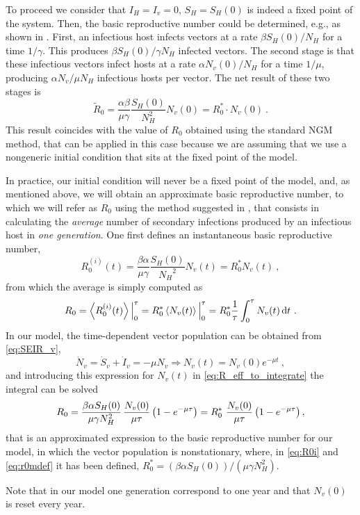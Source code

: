 To proceed we consider that $I_H=I_v=0$, $S_H=S_H(0)$ is indeed a fixed
point of the system. Then, the basic reproductive number could be determined,
e.g., as shown in \cite{Brauer2016}. First, an infectious host infects vectors
at a rate $\beta S_H(0)/N_H$ for a time $1/\gamma$. This produces $\beta
    S_H(0)/\gamma N_H$ infected vectors. The second stage is that these
infectious
vectors infect hosts at a rate $\alpha N_v(0)/N_H$ for a time $1/\mu$,
producing $\alpha N_v/\mu N_H$ infectious hosts per vector. The net result of
these two stages is
\begin{equation}
    \tilde{R}_0=\frac{\alpha\beta}{\mu\gamma}
    \frac{S_H(0)}{N_H^2}N_v(0)=R_0^*
    \cdot
    N_v(0)\ .
    \label{eq:R0tilde}
\end{equation}
This result coincides with the value of $R_0$ obtained using the standard
NGM method, that can be applied in this case because we are assuming that we
use a nongeneric initial condition that sits at the fixed point of the model.

In practice, our initial condition will never be a fixed point of the
model, and, as mentioned above, we will obtain an approximate basic
reproductive number, to which we will refer as $R_0$ using the method suggested
in \cite{GimenezRomero2022_PRE}, that consists in
calculating the \textit{average} number of secondary infections produced by
an infectious host in \textit{one generation}. One first defines an
instantaneous basic reproductive number,
\begin{equation}\label{eq:R0i}
    R_0^{(i)}(t)=\frac{\beta\alpha}{\mu\gamma}\frac{S_H(0)}{{N_H}^2}
    N_v(t)=R_0^* N_v(t) \ ,
\end{equation}
from which the average is simply computed as
\begin{equation}\label{eq:R_eff_to_integrate}
    R_0=\left<R_0^{(i)}(t)\right>\Big\rvert_{0}^{\tau}=
    R_0^*\left<N_v(t)\right>\Big\rvert_{0}^{\tau}=
    R_0^*\frac{1}{\tau}\int_0^{\tau}N_v(t)
    \, \mathrm{d} t \ .
\end{equation}
In our model, the time-dependent vector population can be obtained from
\cref{eq:SEIR_v},
\begin{equation}
    \dot{N}_v=\dot{S}_v+\dot{I}_v=-\mu N_v \Longrightarrow
    N_v(t)=N_v(0)e^{-\mu t} \ ,
\end{equation}
and introducing this expression for $N_v(t)$ in
\cref{eq:R_eff_to_integrate} the integral can be solved
\begin{equation}
    R_0={{\beta\alpha S_H(0)}\over{\mu\gamma N_H ^2}}
    \,\frac{N_v(0)}{\mu\tau}\left(1-e^{-\mu\tau}\right)=
    R_0^*\ \frac{N_v(0)}{\mu\tau}\left(1-e^{-\mu\tau}\right) ,
    \label{eq:r0mdef}
\end{equation}
that is an approximated expression to the basic reproductive number for our
model, in which the vector population is nonstationary,
where, in \cref{eq:R0i} and \cref{eq:r0mdef} it has been defined, $R_0^*=
    (\beta\alpha S_H(0))/(\mu\gamma N_H ^2)$.

Note that in our model one generation correspond to one year and that
$N_v(0)$ is reset every year.